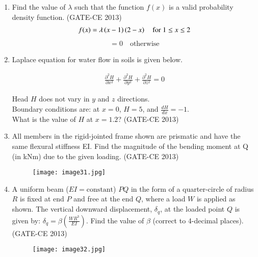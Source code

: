 \documentclass[journal,12pt,onecolumn]{article}
\theoremstyle{remark}
\begin{document}
\begin{enumerate}
    \item Find the value of $\lambda$ such that the function $f(x)$ is a valid probability density function. \underline{\hspace{3cm}} (GATE-CE 2013)
    \begin{align}
    f(x) = \lambda \left(x-1\right)\left(2-x\right) \quad \text{for } 1 \leq x \leq 2
    \end{align}
    \begin{align}
    = 0 \quad \text{otherwise}
    \end{align}
    
    \item Laplace equation for water flow in soils is given below.
    
    \begin{align}
    \frac{\partial^2 H}{\partial x^2} + \frac{\partial^2 H}{\partial y^2} + \frac{\partial^2 H}{\partial z^2} = 0
    \end{align}
    
    Head $H$ does not vary in $y$ and $z$ directions.\\
    Boundary conditions are: at $x = 0$, $H = 5$, and $\frac{dH}{dx} = -1$.\\
    What is the value of $H$ at $x = 1.2$? \underline{\hspace{3cm}} (GATE-CE 2013)
    
    \item All members in the rigid-jointed frame shown are prismatic and have the same flexural stiffness EI. Find the magnitude of the bending moment at Q (in kNm) due to the given loading. \underline{\hspace{3cm}} (GATE-CE 2013)
    
    \begin{figure}[H]
    \centering
    \texttt{[image: image31.jpg]}  
    \caption{}
    \label{fig:2}
    \end{figure}
    
    \item A uniform beam ($EI = \text{constant}$) $PQ$ in the form of a quarter-circle of radius $R$ is fixed at end $P$ and free at the end $Q$, where a load $W$ is applied as shown. The vertical downward displacement, $\delta_q$, at the loaded point $Q$ is given by: 
    $\delta_q = \beta \left( \frac{WR^3}{EI} \right)$. Find the value of $\beta$ (correct to 4-decimal places). \underline{\hspace{3cm}} (GATE-CE 2013)
    
    \begin{figure}[H]
    \centering
    \texttt{[image: image32.jpg]}  
    \caption{}
    \label{fig:3}
    \end{figure}
    

\end{enumerate}
\end{document}
